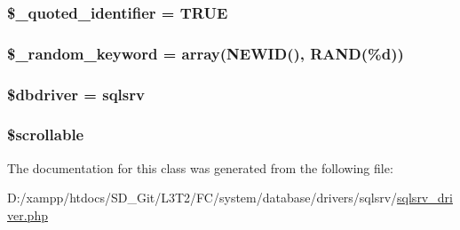 \subsubsection[{\$\+\_\+quoted\+\_\+identifier}]{\setlength{\rightskip}{0pt plus 5cm}\$\+\_\+quoted\+\_\+identifier = T\+R\+U\+E\hspace{0.3cm}{\ttfamily [protected]}}\label{class_c_i___d_b__sqlsrv__driver_a1dae2f0e9ad7299438a9976d6cdbf2ad}
\hypertarget{class_c_i___d_b__sqlsrv__driver_a10213aa6e05f6d924d3277bb1d2fea00}{}
\subsubsection[{\$\+\_\+random\+\_\+keyword}]{\setlength{\rightskip}{0pt plus 5cm}\$\+\_\+random\+\_\+keyword = array(\textquotesingle{}N\+E\+W\+I\+D()\textquotesingle{}, \textquotesingle{}R\+A\+N\+D(\%{\bf d})\textquotesingle{})\hspace{0.3cm}{\ttfamily [protected]}}\label{class_c_i___d_b__sqlsrv__driver_a10213aa6e05f6d924d3277bb1d2fea00}
\hypertarget{class_c_i___d_b__sqlsrv__driver_a0cde2a16322a023d040aa7f725877597}{}
\subsubsection[{\$dbdriver}]{\setlength{\rightskip}{0pt plus 5cm}\$dbdriver = \textquotesingle{}sqlsrv\textquotesingle{}}\label{class_c_i___d_b__sqlsrv__driver_a0cde2a16322a023d040aa7f725877597}
\hypertarget{class_c_i___d_b__sqlsrv__driver_a76095eacf021915db9aabc44ecf58555}{}
\subsubsection[{\$scrollable}]{\setlength{\rightskip}{0pt plus 5cm}\$scrollable}\label{class_c_i___d_b__sqlsrv__driver_a76095eacf021915db9aabc44ecf58555}


The documentation for this class was generated from the following file\+:\begin{DoxyCompactItemize}
\item 
D\+:/xampp/htdocs/\+S\+D\+\_\+\+Git/\+L3\+T2/\+F\+C/system/database/drivers/sqlsrv/\hyperlink{sqlsrv__driver_8php}{sqlsrv\+\_\+driver.\+php}\end{DoxyCompactItemize}
